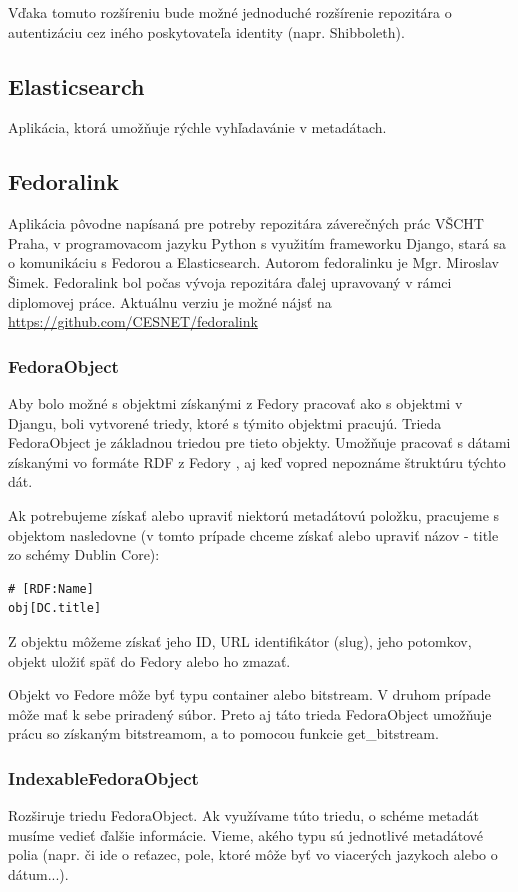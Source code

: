 \documentclass[thesis=M,slovak]{FITthesis}[2013/05/06]
\begin{document}
Vďaka tomuto rozšíreniu bude možné jednoduché rozšírenie repozitára o autentizáciu cez iného poskytovateľa identity (napr. Shibboleth).

\subsection{Elasticsearch}
Aplikácia, ktorá umožňuje rýchle vyhľadavánie v metadátach.

\subsection{Fedoralink}
Aplikácia pôvodne napísaná pre potreby repozitára záverečných prác VŠCHT Praha, v programovacom jazyku Python s využitím frameworku Django, stará sa o komunikáciu s Fedorou a Elasticsearch. Autorom fedoralinku je Mgr. Miroslav Šimek. Fedoralink bol počas vývoja repozitára ďalej upravovaný v rámci diplomovej práce. Aktuálnu verziu je možné nájsť na \url{https://github.com/CESNET/fedoralink}

\subsubsection{FedoraObject}
Aby bolo možné s objektmi získanými z Fedory pracovať ako s objektmi v Djangu, boli vytvorené triedy, ktoré s týmito objektmi pracujú. Trieda FedoraObject je základnou triedou pre tieto objekty. Umožňuje pracovať s dátami získanými vo formáte RDF z Fedory , aj keď vopred nepoznáme štruktúru týchto dát.

Ak potrebujeme získať alebo upraviť niektorú metadátovú položku, pracujeme s objektom nasledovne (v tomto prípade chceme získať alebo upraviť názov - title zo schémy Dublin Core): 
\begin{lstlisting}[frame=single] 
# [RDF:Name]
obj[DC.title]
\end{lstlisting}

Z objektu môžeme získať jeho ID, URL identifikátor (slug), jeho potomkov, objekt uložiť späť do Fedory alebo ho zmazať.

Objekt vo Fedore môže byť typu container alebo bitstream. V druhom prípade môže mať k sebe priradený súbor. Preto aj táto trieda FedoraObject umožňuje prácu so získaným bitstreamom, a to pomocou funkcie get\_bitstream.

\subsubsection{IndexableFedoraObject}
Rozširuje triedu FedoraObject. Ak využívame túto triedu, o schéme metadát musíme vedieť ďalšie informácie. Vieme, akého typu sú jednotlivé metadátové polia (napr. či ide o reťazec, pole, ktoré môže byť vo viacerých jazykoch alebo o dátum...).
\end{document}
